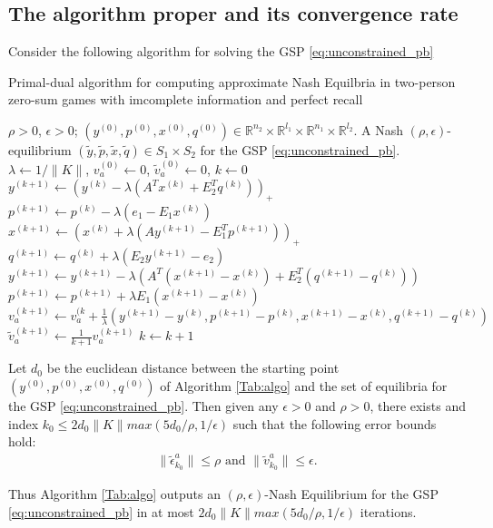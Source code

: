 \documentclass[envcountsame]{llcns2e/llncs}
\begin{document}
\subsection{The algorithm proper and its convergence rate}
Consider the following algorithm for solving the GSP
\eqref{eq:unconstrained_pb}
\begin{algorithm}
\caption{Primal-dual algorithm for computing approximate Nash
  Equilbria in two-person zero-sum games with imcomplete information
  and perfect recall}
\label{Tab:algo}
\begin{algorithmic}[1]
\Require $\rho >0$, $\epsilon > 0$; $(y^{(0)},p^{(0)},x^{(0)},q^{(0)})
\in \mathbb{R}^{n_2}
  \times \mathbb{R}^{l_1} \times \mathbb{R}^{n_1} \times
  \mathbb{R}^{l_2}$.
\Ensure A Nash $(\rho, \epsilon)$-equilibrium
$(\tilde{y},\tilde{p},\tilde{x},\tilde{q}) \in S_1 \times S_2$ for
the GSP \eqref{eq:unconstrained_pb}.
\State  $\lambda \leftarrow 1/\|K\|$, ${v}_a^{(0)} \leftarrow 0$,
$\tilde{v}_a^{(0)} \leftarrow 0$, $k \leftarrow 0$
\State $y^{(k + 1)} \leftarrow (y^{(k)} - \lambda (A^Tx^{(k)} +
E_2^Tq^{(k)}))_+$
\State  \hspace{.5em}$p^{(k+1)} \leftarrow p^{(k)} -
\lambda(e_1-E_1x^{(k)})$
\State $x^{(k + 1)} \leftarrow (x^{(k)} + \lambda (Ay^{(k+1)} -
E_1^Tp^{(k+1)}))_+$
\State  \hspace{.5em}$q^{(k+1)} \leftarrow q^{(k)} +
\lambda(E_2y^{(k+1)}-e_2)$
\State $y^{(k+1)} \leftarrow y^{(k+1)} - \lambda
(A^T(x^{(k+1)}-x^{(k)}) + E_2^T(q^{(k+1)}-q^{(k)}))$
\State $p^{(k+1)} \leftarrow p^{(k+1)} + \lambda
E_1(x^{(k+1)}-x^{(k)})$
\State ${v}_a^{(k+1)} \leftarrow {v}_a^{(k} +
\frac{1}{\lambda}(y^{(k+1)}-y^{(k)},p^{(k+1)}-p^{(k)},x^{(k+1)}-x^{(k)},q^{(k+1)}-q^{(k)})$
\State $\tilde{v}_a^{(k+1)} \leftarrow \frac{1}{k + 1}v_a^{(k+1)}$
\State $k \leftarrow k + 1$
\EndWhile
\end{algorithmic}
\end{algorithm}

\begin{theorem}
Let $d_0$ be the euclidean distance between the starting point
$(y^{(0)},p^{(0)},x^{(0)},q^{(0)})$ of Algorithm \ref{Tab:algo} and the
set of equilibria for the GSP \eqref{eq:unconstrained_pb}.
Then given any $\epsilon > 0$ and $\rho > 0$, there exists and index
$k_0 \le 2d_0\|K\|max(5d_0/\rho, 1/\epsilon)$ such that the following
error bounds hold:
\begin{eqnarray}
\|\tilde{\epsilon}^{a}_{k_0}\| \le \rho\text{ and }\|\tilde{v}^{a}_{k_0}\| \le
\epsilon.
\end{eqnarray}

Thus Algorithm \ref{Tab:algo} outputs an $(\rho,\epsilon)$-Nash
Equilibrium for the GSP \eqref{eq:unconstrained_pb}
in at most $2d_0\|K\|max(5d_0/\rho, 1/\epsilon)$ iterations.
\end{theorem}
\end{document}
